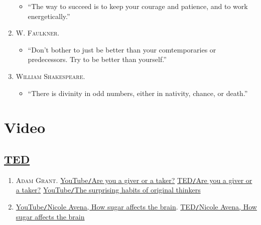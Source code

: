 \documentclass[oneside]{book}
\numberwithin{equation}{section}
\begin{document}
\begin{enumerate}
	\begin{itemize}
		\item ``The way to succeed is to keep your courage and patience, and to work energetically.''
	\end{itemize}
	\item \textsc{W. Faulkner.}
	\begin{itemize}
		\item ``Don't bother to just be better than your comtemporaries or predecessors. Try to be better than yourself.''
	\end{itemize}
	\item \textsc{William Shakespeare.}
	\begin{itemize}
		\item ``There is divinity in odd numbers, either in nativity, chance, or death.''
	\end{itemize}
\end{enumerate}


\chapter{Video}

\section{\href{https://www.ted.com/}{TED}}

\begin{enumerate}
	\item \textsc{Adam Grant.} \href{https://www.youtube.com/watch?v=YyXRYgjQXX0}{YouTube\texttt{/}Are you a giver or a taker?} \href{https://www.ted.com/talks/adam_grant_are_you_a_giver_or_a_taker}{TED\texttt{/}Are you a giver or a taker?} \href{https://www.youtube.com/watch?v=fxbCHn6gE3U}{YouTube\texttt{/}The surprising habits of original thinkers}
	\item \href{https://www.youtube.com/watch?v=lEXBxijQREo}{YouTube\texttt{/}Nicole Avena, How sugar affects the brain}. \href{https://ed.ted.com/lessons/how-sugar-affects-the-brain-nicole-avena}{TED\texttt{/}Nicole Avena, How sugar affects the brain}
\end{enumerate}


\end{document}
